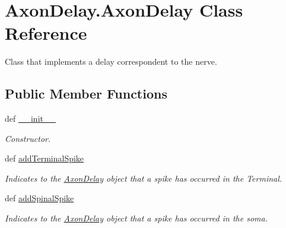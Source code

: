 \hypertarget{class_axon_delay_1_1_axon_delay}{\section{Axon\-Delay.\-Axon\-Delay Class Reference}
\label{class_axon_delay_1_1_axon_delay}
}


Class that implements a delay correspondent to the nerve.  


\subsection*{Public Member Functions}
\begin{DoxyCompactItemize}
\item 
def \hyperlink{class_axon_delay_1_1_axon_delay_ae4b6037beb2f833d82c5703bcb47ffb0}{\-\_\-\-\_\-init\-\_\-\-\_\-}
\begin{DoxyCompactList}\small\item\em Constructor. \end{DoxyCompactList}\item 
def \hyperlink{class_axon_delay_1_1_axon_delay_a49115bea963cde5e2c4317510d73cf7c}{add\-Terminal\-Spike}
\begin{DoxyCompactList}\small\item\em Indicates to the \hyperlink{class_axon_delay_1_1_axon_delay}{Axon\-Delay} object that a spike has occurred in the Terminal. \end{DoxyCompactList}\item 
def \hyperlink{class_axon_delay_1_1_axon_delay_a5483df94745af77bf54f707f9a05a0e0}{add\-Spinal\-Spike}
\begin{DoxyCompactList}\small\item\em Indicates to the \hyperlink{class_axon_delay_1_1_axon_delay}{Axon\-Delay} object that a spike has occurred in the soma. \end{DoxyCompactList}\end{DoxyCompactItemize}
